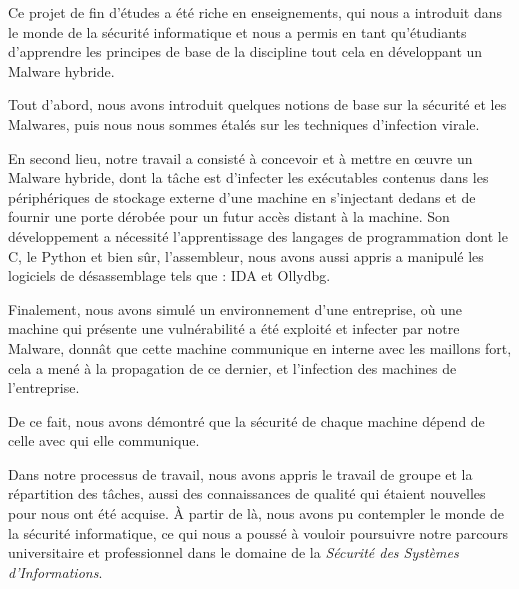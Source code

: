 
Ce projet de fin d'études a été riche en enseignements, qui nous a introduit dans le monde de la sécurité informatique et nous a permis en tant qu'étudiants d'apprendre les principes de base de la discipline tout cela en développant un Malware hybride.

Tout d'abord, nous avons introduit quelques notions de base sur la sécurité et les Malwares, puis nous nous sommes étalés sur les techniques d'infection virale.

En second lieu, notre travail a consisté à concevoir et à mettre en œuvre un Malware hybride, dont la tâche est d'infecter les exécutables contenus dans les périphériques de stockage externe d'une machine en s'injectant dedans et de fournir une porte dérobée pour un futur accès distant à la machine. Son développement a nécessité l'apprentissage des langages de programmation dont le C, le Python et bien sûr, l'assembleur, nous avons aussi appris a manipulé les logiciels de désassemblage tels que : IDA et Ollydbg.

Finalement, nous avons simulé un environnement d'une entreprise, où une machine qui présente une vulnérabilité a été exploité et infecter par notre Malware, donnât que cette machine communique en interne avec les maillons fort, cela a mené à la propagation de ce dernier, et l'infection des machines de l'entreprise.

De ce fait, nous avons démontré que la sécurité de chaque machine dépend de celle  avec qui elle communique.

Dans notre processus de travail, nous avons appris le travail de groupe et la répartition des tâches, aussi des connaissances de qualité qui étaient nouvelles pour nous ont été acquise. À partir de là, nous avons pu contempler le monde de la sécurité informatique, ce qui nous a poussé à vouloir poursuivre notre parcours universitaire et professionnel dans le domaine de la \emph{Sécurité des Systèmes d'Informations}.
